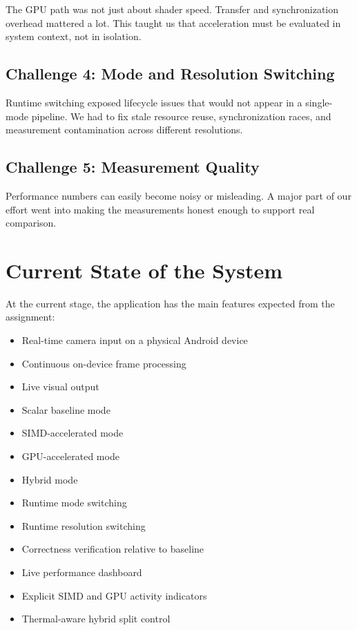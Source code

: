\documentclass[12pt,a4paper]{article}
\begin{document}
The GPU path was not just about shader speed. Transfer and synchronization overhead mattered a lot. This taught us that acceleration must be evaluated in system context, not in isolation.

\subsection{Challenge 4: Mode and Resolution Switching}

Runtime switching exposed lifecycle issues that would not appear in a single-mode pipeline. We had to fix stale resource reuse, synchronization races, and measurement contamination across different resolutions.

\subsection{Challenge 5: Measurement Quality}

Performance numbers can easily become noisy or misleading. A major part of our effort went into making the measurements honest enough to support real comparison.

\section{Current State of the System}

At the current stage, the application has the main features expected from the assignment:

\begin{itemize}
\item Real-time camera input on a physical Android device
\item Continuous on-device frame processing
\item Live visual output
\item Scalar baseline mode
\item SIMD-accelerated mode
\item GPU-accelerated mode
\item Hybrid mode
\item Runtime mode switching
\item Runtime resolution switching
\item Correctness verification relative to baseline
\item Live performance dashboard
\item Explicit SIMD and GPU activity indicators
\item Thermal-aware hybrid split control
\end{itemize}
\end{document}
